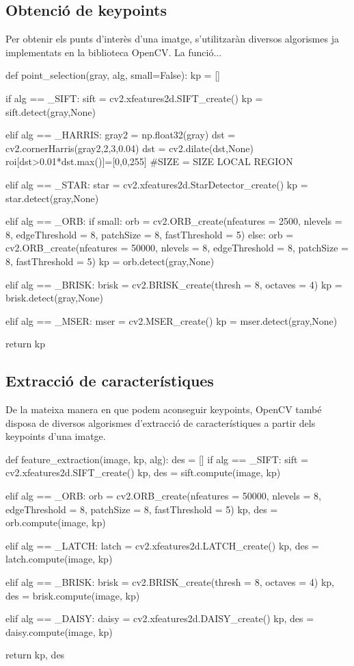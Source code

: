	\subsection{Obtenció de keypoints}
		Per obtenir els punts d'interès d'una imatge, s'utilitzaràn diversos algorismes ja implementats en la biblioteca OpenCV. La funció... \\
		\begin{python}
def point_selection(gray, alg, small=False):
	kp = []

	if alg == _SIFT:
		sift = cv2.xfeatures2d.SIFT_create()
		kp = sift.detect(gray,None)

	elif alg == _HARRIS:
		gray2 = np.float32(gray)
		dst = cv2.cornerHarris(gray2,2,3,0.04)
		dst = cv2.dilate(dst,None)
		roi[dst>0.01*dst.max()]=[0,0,255]
		#SIZE = SIZE LOCAL REGION

	elif alg == _STAR:
		star = cv2.xfeatures2d.StarDetector_create()
		kp = star.detect(gray,None)

	elif alg == _ORB:
		if small:
			orb = cv2.ORB_create(nfeatures = 2500, nlevels = 8, edgeThreshold = 8, patchSize = 8, fastThreshold = 5)
		else:
			orb = cv2.ORB_create(nfeatures = 50000, nlevels = 8, edgeThreshold = 8, patchSize = 8, fastThreshold = 5)
		kp = orb.detect(gray,None)

	elif alg == _BRISK:
		brisk = cv2.BRISK_create(thresh = 8, octaves = 4)
		kp = brisk.detect(gray,None)

	elif alg == _MSER:
		mser = cv2.MSER_create()
		kp = mser.detect(gray,None)

	return kp
		\end{python}
	\subsection{Extracció de característiques}
		De la mateixa manera en que podem aconseguir keypoints, OpenCV també disposa de diversos algorismes d'extracció de característiques a partir dels keypoints d'una imatge.\\
		\begin{python}
def feature_extraction(image, kp, alg):
	des = []
	if alg == _SIFT:
		sift = cv2.xfeatures2d.SIFT_create()
		kp, des = sift.compute(image, kp)

	elif alg == _ORB:
		orb = cv2.ORB_create(nfeatures = 50000, nlevels = 8, edgeThreshold = 8,
		 patchSize = 8, fastThreshold = 5)
		kp, des = orb.compute(image, kp)

	elif alg == _LATCH:
		latch = cv2.xfeatures2d.LATCH_create()
		kp, des = latch.compute(image, kp)

	elif alg == _BRISK:
		brisk = cv2.BRISK_create(thresh = 8, octaves = 4)
		kp, des = brisk.compute(image, kp)

	elif alg == _DAISY:
		daisy = cv2.xfeatures2d.DAISY_create()
		kp, des = daisy.compute(image, kp)

	return kp, des
		\end{python}
\newpage
